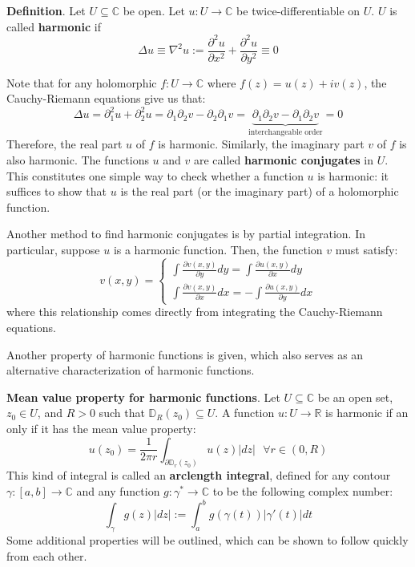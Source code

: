 \textbf{Definition}. Let $U\subseteq\mathbb{C}$ be open. Let $u:U\to\mathbb{C}$ be twice-differentiable on $U$. $U$ is called \textbf{harmonic} if \[\Delta u \equiv \nabla^2 u := \displaystyle\frac{\partial^2 u}{\partial x^2} +\frac{\partial^2 u}{\partial y^2} \equiv 0\]

Note that for any holomorphic $f:U\to\mathbb{C}$ where $f(z) = u(z) + i v(z)$, the Cauchy-Riemann equations give us that: \[\Delta u = \partial_1^2 u + \partial_2^2 u = \partial_1 \partial_2 v - \partial_2\partial_1 v = \underbrace{\partial_1\partial_2 v - \partial_1\partial_2 v}_\text{interchangeable order} = 0\] Therefore, the real part $u$ of $f$ is harmonic. Similarly, the imaginary part $v$ of $f$ is also harmonic. The functions $u$ and $v$ are called \textbf{harmonic conjugates} in $U$. This constitutes one simple way to check whether a function $u$ is harmonic: it suffices to show that $u$ is the real part (or the imaginary part) of a holomorphic function. 

Another method to find harmonic conjugates is by partial integration. In particular, suppose $u$ is a harmonic function. Then, the function $v$ must satisfy: \[v(x,y) = \begin{cases}
    \displaystyle\int \frac{\partial v(x,y)}{\partial y}dy = \displaystyle\int \frac{\partial u(x,y)}{\partial x} dy\\
    \displaystyle\int\frac{\partial v(x,y)}{\partial x}dx = -\displaystyle\int \frac{\partial u(x,y)}{\partial y}dx
\end{cases}\] where this relationship comes directly from integrating the Cauchy-Riemann equations.

Another property of harmonic functions is given, which also serves as an alternative characterization of harmonic functions.

\textbf{Mean value property for harmonic functions}. Let $U\subseteq\mathbb{C}$ be an open set, $z_0\in U$, and $R>0$ such that $\mathbb{D}_R(z_0)\subseteq U$. A function $u:U\to\mathbb{R}$ is harmonic if an only if it has the mean value property: \[u(z_0) = \frac{1}{2\pi r} \int_{\partial\mathbb{D}_r(z_0)} u(z)|dz| \ \ \ \forall r\in (0,R) \tag{Mean Value Property}\] This kind of integral is called an \textbf{arclength integral}, defined for any contour $\gamma:[a,b]\to\mathbb{C}$ and any function $g:\gamma^*\to \mathbb{C}$ to be the following complex number: \[\int_\gamma g(z)|dz| := \int_a^b g(\gamma(t)) |\gamma'(t)| dt\] Some additional properties will be outlined, which can be shown to follow quickly from each other.

